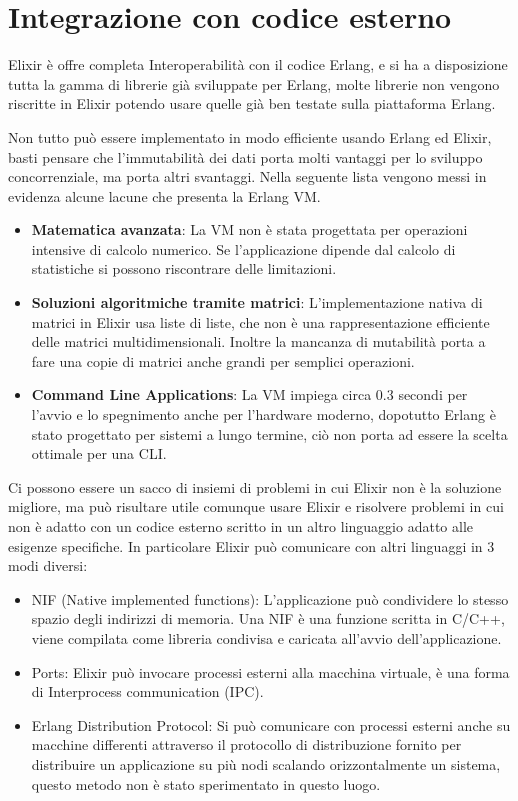 \section{Integrazione con codice esterno}\label{subsec:mysubsection}
Elixir è offre completa Interoperabilità
con il codice Erlang, e si ha a disposizione tutta la gamma di librerie
già sviluppate per Erlang, molte librerie non vengono riscritte in Elixir
potendo usare quelle già ben testate sulla piattaforma Erlang.

Non tutto può essere implementato in modo efficiente
usando Erlang ed Elixir, basti pensare che l'immutabilità dei dati
porta molti vantaggi per lo sviluppo concorrenziale, ma porta altri
svantaggi. Nella seguente lista vengono messi in evidenza alcune
lacune che presenta la Erlang VM.

\begin{itemize}
	\item \textbf{Matematica avanzata}: La VM non è stata progettata per operazioni
	intensive di calcolo numerico. Se l'applicazione dipende dal calcolo di
	statistiche si possono riscontrare delle limitazioni.
	\item \textbf{Soluzioni algoritmiche tramite matrici}: L'implementazione
	nativa di matrici in Elixir usa liste di liste, che non è una rappresentazione
	efficiente delle matrici multidimensionali. Inoltre la mancanza di mutabilità
	porta a fare una copie di matrici anche grandi per semplici operazioni.
	\item \textbf{Command Line Applications}: La VM impiega circa 0.3 secondi
	per l'avvio e lo spegnimento anche per l'hardware moderno, dopotutto Erlang
	è stato progettato per sistemi a lungo termine, ciò non porta ad essere
	la scelta ottimale per una CLI.
\end{itemize}

Ci possono essere un sacco di insiemi di problemi in cui Elixir
non è la soluzione migliore, ma può risultare utile comunque
usare Elixir e risolvere problemi in cui non è adatto
con un codice esterno scritto in un altro linguaggio adatto
alle esigenze specifiche.
In particolare Elixir può comunicare con altri linguaggi
in 3 modi diversi:

\begin{itemize}
	\item NIF (Native implemented functions): L'applicazione può condividere lo stesso
	spazio degli indirizzi di memoria.
	Una NIF è una funzione scritta in C/C++, viene compilata
	come libreria condivisa e caricata all'avvio dell'applicazione.
	\item Ports: Elixir può invocare processi esterni alla macchina
	virtuale, è una forma di Interprocess communication (IPC).
	\item Erlang Distribution Protocol: Si può comunicare con
	processi esterni anche su macchine differenti
	attraverso il protocollo di distribuzione fornito per distribuire
	un applicazione su più nodi scalando orizzontalmente un sistema,
	questo metodo non è stato sperimentato in questo luogo.
\end{itemize}


